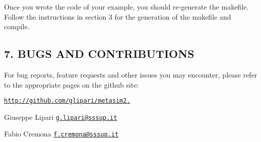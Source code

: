 Once you wrote the code of your example, you should re-\/generate the makefile. Follow the instructions in section 3 for the generation of the makefile and compile.

\subsection*{7. B\+U\+GS A\+ND C\+O\+N\+T\+R\+I\+B\+U\+T\+I\+O\+NS}

For bug reports, feature requests and other issues you may encounter, please refer to the appropriate pages on the github site\+:

\href{http://github.com/glipari/metasim2.0}{\tt http\+://github.\+com/glipari/metasim2.}

Giuseppe Lipari \href{mailto:g.lipari@sssup.it}{\tt g.\+lipari@sssup.\+it}

Fabio Cremona \href{mailto:f.cremona@sssup.it}{\tt f.\+cremona@sssup.\+it} 